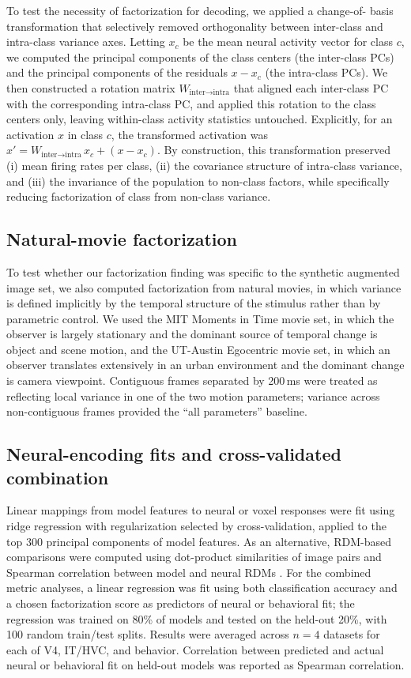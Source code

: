\documentclass[11pt]{article}
\begin{document}
To test the necessity of factorization for decoding, we applied a change-of-
basis transformation that selectively removed orthogonality between
inter-class and intra-class variance axes. Letting \(x_c\) be the mean
neural activity vector for class \(c\), we computed the principal components
of the class centers (the inter-class PCs) and the principal components of
the residuals \(x - x_c\) (the intra-class PCs). We then constructed a
rotation matrix \(W_{\text{inter}\to\text{intra}}\) that aligned each
inter-class PC with the corresponding intra-class PC, and applied this
rotation to the class centers only, leaving within-class activity
statistics untouched. Explicitly, for an activation \(x\) in class \(c\),
the transformed activation was
\(x' = W_{\text{inter}\to\text{intra}}\,x_c + (x - x_c)\). By construction,
this transformation preserved (i) mean firing rates per class, (ii) the
covariance structure of intra-class variance, and (iii) the invariance of
the population to non-class factors, while specifically reducing
factorization of class from non-class variance.

\subsection{Natural-movie factorization}

To test whether our factorization finding was specific to the synthetic
augmented image set, we also computed factorization from natural movies, in
which variance is defined implicitly by the temporal structure of the
stimulus rather than by parametric control. We used the MIT
Moments in Time movie set, in which the observer is largely stationary and
the dominant source of temporal change is object and scene motion, and the
UT-Austin Egocentric movie set, in which an observer translates extensively
in an urban environment and the dominant change is camera viewpoint.
Contiguous frames separated by 200\,ms were treated as reflecting local
variance in one of the two motion parameters; variance across non-contiguous
frames provided the ``all parameters'' baseline.

\subsection{Neural-encoding fits and cross-validated combination}

Linear mappings from model features to neural or voxel responses were fit
using ridge regression with regularization selected by cross-validation,
applied to the top 300 principal components of model features. As an
alternative, RDM-based comparisons were computed using dot-product
similarities of image pairs and Spearman correlation between model and
neural RDMs \citep{kriegeskorte2008representational}. For the combined
metric analyses, a linear regression was fit using both classification
accuracy and a chosen factorization score as predictors of neural or
behavioral fit; the regression was trained on 80\% of models and tested on
the held-out 20\%, with 100 random train/test splits. Results were averaged
across \(n=4\) datasets for each of V4, IT/HVC, and behavior. Correlation
between predicted and actual neural or behavioral fit on held-out models
was reported as Spearman correlation.
\end{document}
